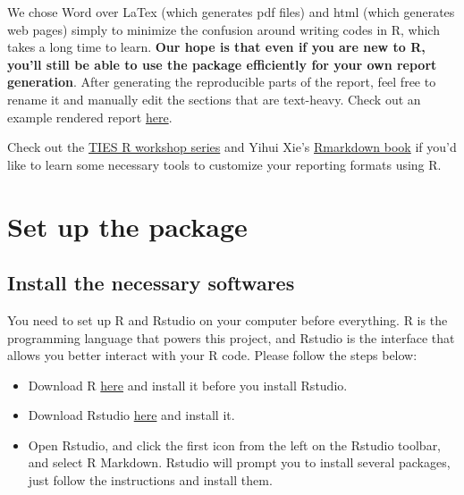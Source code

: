 \documentclass[
]{book}
\providecommand{\tightlist}{%
  \setlength{\itemsep}{0pt}\setlength{\parskip}{0pt}}
\begin{document}
We chose Word over LaTex (which generates pdf files) and html (which generates web pages) simply to minimize the confusion around writing codes in R, which takes a long time to learn. \textbf{Our hope is that even if you are new to R, you'll still be able to use the package efficiently for your own report generation}. After generating the reproducible parts of the report, feel free to rename it and manually edit the sections that are text-heavy. Check out an example rendered report \href{https://nyu.box.com/s/wbwcqj3u2x9y6levrwgn9przp7ptr5hp}{here}.

Check out the \href{https://github.com/nyuglobalties/workshops}{TIES R workshop series} and Yihui Xie's \href{https://bookdown.org/yihui/rmarkdown/}{Rmarkdown book} if you'd like to learn some necessary tools to customize your reporting formats using R.

\hypertarget{set-up-the-package}{%
\chapter{Set up the package}\label{set-up-the-package}}

\hypertarget{install-the-necessary-softwares}{%
\section{Install the necessary softwares}\label{install-the-necessary-softwares}}

You need to set up R and Rstudio on your computer before everything. R is the programming language that powers this project, and Rstudio is the interface that allows you better interact with your R code. Please follow the steps below:

\begin{itemize}
\tightlist
\item
  Download R \href{https://cran.r-project.org/mirrors.html}{here} and install it before you install Rstudio.
\item
  Download Rstudio \href{https://rstudio.com/products/rstudio/download/\#download}{here} and install it.
\item
  Open Rstudio, and click the first icon from the left on the Rstudio toolbar, and select R Markdown. Rstudio will prompt you to install several packages, just follow the instructions and install them.
\end{itemize}
\end{document}
